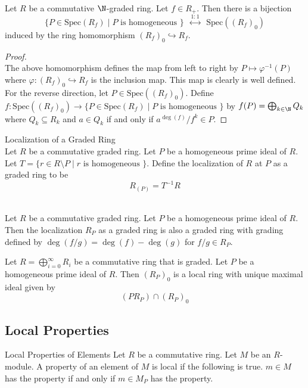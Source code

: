 \documentclass[a4paper]{article}
\begin{document}
\begin{prp}{}{}\\
Let $R$ be a commutative $\N$-graded ring. Let $f\in R_+$. Then there is a bijection $$\{P\in\text{Spec}(R_f)\;|\;P\text{ is homogeneous }\}\;\;\overset{1:1}{\longleftrightarrow}\;\;\text{Spec}((R_f)_0)$$ induced by the ring homomorphism $(R_f)_0\hookrightarrow R_f$. 
\begin{proof}\\
The above homomorphism defines the map from left to right by $P\mapsto\varphi^{-1}(P)$ where $\varphi:(R_f)_0\hookrightarrow R_f$ is the inclusion map. This map is clearly is well defined. For the reverse direction, let $P\in\text{Spec}((R_f)_0)$. Define $f:\text{Spec}((R_f)_0)\to\{P\in\text{Spec}(R_f)\;|\;P\text{ is homogeneous }\}$ by $f(P)=\bigoplus_{k\in\N}Q_k$ where $Q_k\subseteq R_k$ and $a\in Q_k$ if and only if $a^{\deg(f)}/f^k\in P$. 
\end{proof}
\end{prp}

\begin{defn}{Localization of a Graded Ring}{}\\
Let $R$ be a commutative graded ring. Let $P$ be a homogeneous prime ideal of $R$. Let $T=\{r\in R\setminus P\;|\;r\text{ is homogeneous }\}$. Define the localization of $R$ at $P$ as a graded ring to be $$R_{(P)}=T^{-1}R$$
\end{defn}

\begin{prp}{}{}\\
Let $R$ be a commutative graded ring. Let $P$ be a homogeneous prime ideal of $R$. Then the localization $R_P$ as a graded ring is also a graded ring with grading defined by $\deg(f/g)=\deg(f)-\deg(g)$ for $f/g\in R_P$. 
\end{prp}

\begin{prp}{}{} Let $R=\bigoplus_{i=0}^\infty R_i$ be a commutative ring that is graded. Let $P$ be a homogeneous prime ideal of $R$. Then $(R_P)_0$ is a local ring with unique maximal ideal given by $$(PR_P)\cap(R_P)_0$$
\end{prp}

\subsection{Local Properties}
\begin{defn}{Local Properties of Elements}{} Let $R$ be a commutative ring. Let $M$ be an $R$-module. A property of an element of $M$ is local if the following is true. $m\in M$ has the property if and only if $m\in M_P$ has the property. 
\end{defn}
\end{document}
